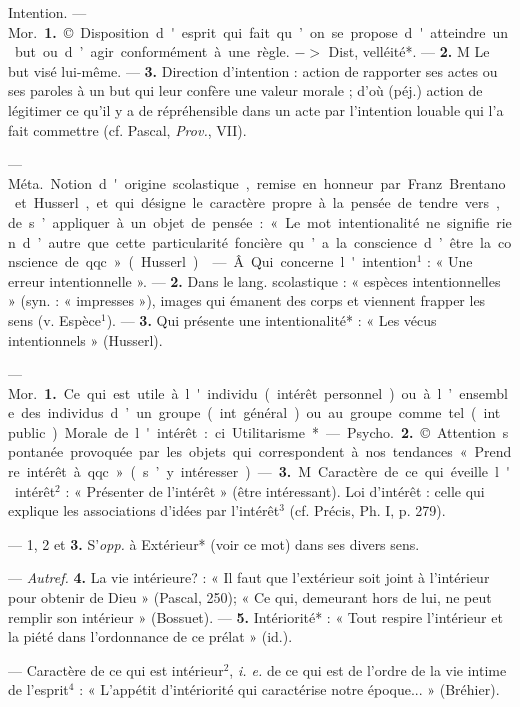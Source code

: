\begin{itemize}[leftmargin=1cm, label=, itemsep=1pt]
\ib{}Intention. — \si{Mor.} {\bf 1.} ©. Disposition
d'esprit qui fait qu’on se propose
d'atteindre un but ou d’agir conformément à une règle. $->$ Dist,
velléité*. — {\bf 2.} M Le but visé lui-même. — {\bf 3.} Direction d'intention :
action de rapporter ses actes ou ses
paroles à un but qui leur confère
une valeur morale ; d’où (péj.)
action de légitimer ce qu'il y a de
répréhensible dans un acte par l'intention louable qui l'a fait commettre (cf. Pascal, {\it Prov.}, VII).

 — \si{Méta.} Notion d'origine scolastique, remise en honneur par Franz Brentano et Husserl,
et qui désigne le caractère propre à
la pensée de tendre vers, de s’appliquer à un objet de pensée : « Le mot
intentionalité ne signifie rien d’autre
que cette particularité foncière qu’a
la conscience d’être la conscience
de qqc. » (Husserl).

 — Â. Qui concerne l'intention$^1$ : « Une erreur intentionnelle ». — {\bf 2.} Dans le lang. scolastique : « espèces intentionnelles »
(syn. : « impresses »), images qui
émanent des corps et viennent
frapper les sens (v. Espèce$^1$). —
 {\bf 3.} Qui présente une intentionalité* :
« Les vécus intentionnels » (Husserl).

 — \si{Mor.} {\bf 1.} Ce qui est utile à
l'individu (intérêt personnel) ou à
l’ensemble des individus d’un groupe
(int. général) ou au groupe comme tel
(int. public). Morale de l'intérêt : ci.
Utilitarisme*.

— \si{Psycho.} {\bf 2.} ©. Attention spontanée provoquée par les objets qui
correspondent à nos tendances
« Prendre intérêt à qqc. » (s’y intéresser). — {\bf 3.} M. Caractère de ce qui
éveille l'intérêt$^2$ : « Présenter de
l'intérêt » (être intéressant). Loi
d'intérêt : celle qui explique les associations d'idées par l'intérêt$^3$ (cf.
Précis, Ph. I, p. 279).

 — 1, 2 et {\bf 3.}
S'{\it opp.} à Extérieur* (voir ce mot)
dans ses divers sens.

 — {\it Autref.} {\bf 4.} La vie
intérieure? : « Il faut que l’extérieur
soit joint à l’intérieur pour obtenir
de Dieu » (Pascal, 250); « Ce qui,
demeurant hors de lui, ne peut remplir son intérieur » (Bossuet). —
 {\bf 5.} Intériorité* : « Tout respire l’intérieur et la piété dans l’ordonnance
de ce prélat » (id.).

 — Caractère de ce qui est
intérieur$^2$, {\it i. e.} de ce qui est de
l’ordre de la vie intime de l'esprit$^4$ :
« L'appétit d'intériorité qui caractérise notre époque... » (Bréhier).


\end{itemize}
